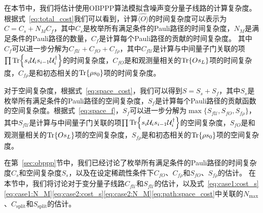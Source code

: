在本节中，我们将估计使用OBPPP算法模拟含噪声变分量子线路的计算复杂度。根据式~\eqref{eq:total_cost}我们可以看到，计算$\widehat{\langle O \rangle}$的时间复杂度可以表示为$C = C_s+N_MC_f$，其中$C_s$是枚举所有满足条件的Pauli路径的时间复杂度，$N_M$是满足条件的Pauli路径的数量，$C_f$是计算每个Pauli路径的贡献的时间复杂度。
其中$C_f$可以进一步分解为$C_{f\mathcal{U}}+C_{fO}+C_{f\rho}$，其中$C_{f\mathcal{U}}$是计算与中间量子门关联的项$\prod\Tr{s_i\mathcal{U}_i s_{i-1}\mathcal{U}_i^\dagger}$的时间复杂度，$C_{fO}$是和观测量相关的$\Tr{Os_L}$项的时间复杂度，$C_{f\rho}$是和初态相关的$\Tr{\rho s_0}$项的时间复杂度。

对于空间复杂度，根据式~\eqref{eq:space_cost}，我们可以得到$S = S_s+S_f$，其中$S_s$是枚举所有满足条件的Pauli路径的空间复杂度，$S_f$是计算每个Pauli路径的贡献函数的空间复杂度。根据式~\eqref{eq:space_f}，$S_f$可以进一步分解为$\max\{S_{f\mathcal{U}},S_{fO},S_{f\rho}\}$，其中$S_{f\mathcal{U}}$是计算与中间量子门关联的项$\prod\Tr{s_i\mathcal{U}_i s_{i-1}\mathcal{U}_i^\dagger}$的空间复杂度，$S_{fO}$是和观测量相关的$\Tr{Os_L}$项的空间复杂度，$S_{f\rho}$是和初态相关的$\Tr{\rho s_0}$项的空间复杂度。

在第~\ref{sec:obppp}节中，我们已经讨论了枚举所有满足条件的Pauli路径的时间复杂度$C_s$和空间复杂度$S_s$，以及在设定稀疏性条件下$C_{fO}$、$C_{f\rho}$和$S_{fO}$、$S_{f\rho}$的估计。
在本节中，我们将讨论对于变分量子线路$C_{f\mathcal{U}}$和$S_{f\mathcal{U}}$的估计，以及式~\eqref{eq:case1:cost_s}\eqref{eq:case1:N_M}\eqref{eq:case2:cost_s}\eqref{eq:case2:N_M}\eqref{eq:path:space_cost}中关联的$N_{\text{max}}$、$C_{\text{split}}$和$S_{\text{split}}$的估计。


